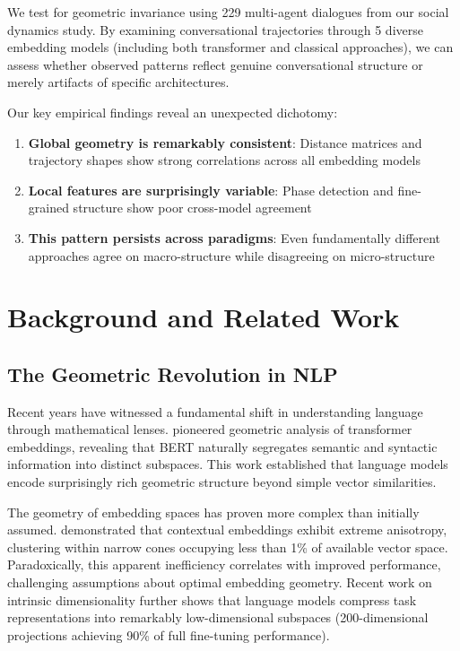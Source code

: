 \documentclass[11pt,letterpaper]{article}
\newcommand{\totalConversations}{229}
\newcommand{\numEmbeddingModels}{5}
\begin{document}
We test for geometric invariance using \totalConversations{} multi-agent dialogues from our social dynamics study. By examining conversational trajectories through \numEmbeddingModels{} diverse embedding models (including both transformer and classical approaches), we can assess whether observed patterns reflect genuine conversational structure or merely artifacts of specific architectures.

Our key empirical findings reveal an unexpected dichotomy:
\begin{enumerate}
\item \textbf{Global geometry is remarkably consistent}: Distance matrices and trajectory shapes show strong correlations across all embedding models
\item \textbf{Local features are surprisingly variable}: Phase detection and fine-grained structure show poor cross-model agreement
\item \textbf{This pattern persists across paradigms}: Even fundamentally different approaches agree on macro-structure while disagreeing on micro-structure
\end{enumerate}

\section{Background and Related Work}

\subsection{The Geometric Revolution in NLP}

Recent years have witnessed a fundamental shift in understanding language through mathematical lenses. \citet{reif2019visualizing} pioneered geometric analysis of transformer embeddings, revealing that BERT naturally segregates semantic and syntactic information into distinct subspaces. This work established that language models encode surprisingly rich geometric structure beyond simple vector similarities.

The geometry of embedding spaces has proven more complex than initially assumed. \citet{ethayarajh2019contextual} demonstrated that contextual embeddings exhibit extreme anisotropy, clustering within narrow cones occupying less than 1\% of available vector space. Paradoxically, this apparent inefficiency correlates with improved performance, challenging assumptions about optimal embedding geometry. Recent work on intrinsic dimensionality \citep{aghajanyan2021intrinsic} further shows that language models compress task representations into remarkably low-dimensional subspaces (200-dimensional projections achieving 90\% of full fine-tuning performance).
\end{document}
